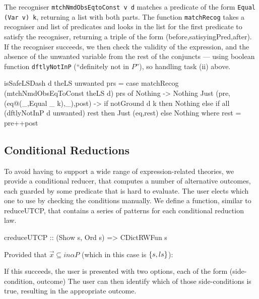 The recogniser \texttt{mtchNmdObsEqtoConst v d} matches a predicate of the form
\texttt{Equal (Var v) k}, returning a list with both parts.
The function \texttt{matchRecog} takes a recogniser and list of predicates
and looks in the list for the first predicate to satisfy
the recogniser, returning a triple of the form
(before,satisyingPred,after).
If the recogniser succeeds,
we then check the validity of the expression,
and the absence of the unwanted variable from the
rest of the conjuncts --- using boolean function
 \texttt{dftlyNotInP} (``definitely not in $P$''),
 so handling task (ii) above.
\begin{code}
isSafeLSDash d theLS unwanted prs
 = case matchRecog (mtchNmdObsEqToConst theLS d) prs of
    Nothing -> Nothing
    Just (pre,(eq@(_,Equal _ k),_),post) ->
     if notGround d k
      then Nothing
      else if all (dftlyNotInP d unwanted) rest
       then Just (eq,rest)
       else Nothing
     where rest = pre++post
\end{code}

\subsection{Conditional Reductions}

To avoid having to support a wide range of expression-related theories,
we provide a conditional reducer, that computes
a number of alternative outcomes, each guarded by some predicate
that is hard to evaluate.
The user elects which one to use by checking the conditions manually.
We define a function, similar to reduceUTCP,
that contains a series of patterns for each conditional reduction law.
\begin{code}
creduceUTCP :: (Show s, Ord s) => CDictRWFun s
\end{code}
Provided that $\vec x \subseteq in\alpha P$
 (which in this case is $\{{s,ls}\}$):
If this succeeds, the user is presented with two options,
each of the form (side-condition, outcome)
The user can then identify which of those side-conditions is true,
resulting in the appropriate outcome.

